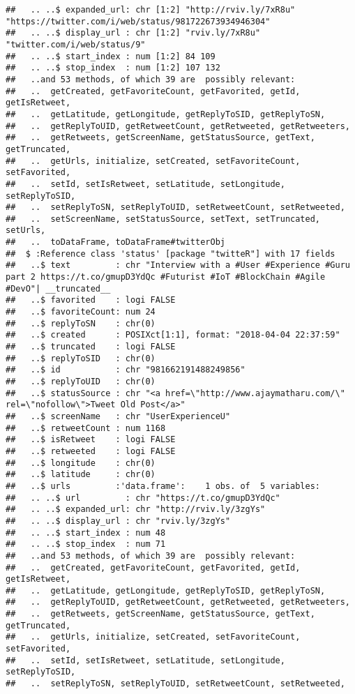 \documentclass[]{article}
\begin{document}
\begin{verbatim}
##   .. ..$ expanded_url: chr [1:2] "http://rviv.ly/7xR8u" "https://twitter.com/i/web/status/981722673934946304"
##   .. ..$ display_url : chr [1:2] "rviv.ly/7xR8u" "twitter.com/i/web/status/9"
##   .. ..$ start_index : num [1:2] 84 109
##   .. ..$ stop_index  : num [1:2] 107 132
##   ..and 53 methods, of which 39 are  possibly relevant:
##   ..  getCreated, getFavoriteCount, getFavorited, getId, getIsRetweet,
##   ..  getLatitude, getLongitude, getReplyToSID, getReplyToSN,
##   ..  getReplyToUID, getRetweetCount, getRetweeted, getRetweeters,
##   ..  getRetweets, getScreenName, getStatusSource, getText, getTruncated,
##   ..  getUrls, initialize, setCreated, setFavoriteCount, setFavorited,
##   ..  setId, setIsRetweet, setLatitude, setLongitude, setReplyToSID,
##   ..  setReplyToSN, setReplyToUID, setRetweetCount, setRetweeted,
##   ..  setScreenName, setStatusSource, setText, setTruncated, setUrls,
##   ..  toDataFrame, toDataFrame#twitterObj
##  $ :Reference class 'status' [package "twitteR"] with 17 fields
##   ..$ text         : chr "Interview with a #User #Experience #Guru part 2 https://t.co/gmupD3YdQc #Futurist #IoT #BlockChain #Agile #DevO"| __truncated__
##   ..$ favorited    : logi FALSE
##   ..$ favoriteCount: num 24
##   ..$ replyToSN    : chr(0) 
##   ..$ created      : POSIXct[1:1], format: "2018-04-04 22:37:59"
##   ..$ truncated    : logi FALSE
##   ..$ replyToSID   : chr(0) 
##   ..$ id           : chr "981662191488249856"
##   ..$ replyToUID   : chr(0) 
##   ..$ statusSource : chr "<a href=\"http://www.ajaymatharu.com/\" rel=\"nofollow\">Tweet Old Post</a>"
##   ..$ screenName   : chr "UserExperienceU"
##   ..$ retweetCount : num 1168
##   ..$ isRetweet    : logi FALSE
##   ..$ retweeted    : logi FALSE
##   ..$ longitude    : chr(0) 
##   ..$ latitude     : chr(0) 
##   ..$ urls         :'data.frame':    1 obs. of  5 variables:
##   .. ..$ url         : chr "https://t.co/gmupD3YdQc"
##   .. ..$ expanded_url: chr "http://rviv.ly/3zgYs"
##   .. ..$ display_url : chr "rviv.ly/3zgYs"
##   .. ..$ start_index : num 48
##   .. ..$ stop_index  : num 71
##   ..and 53 methods, of which 39 are  possibly relevant:
##   ..  getCreated, getFavoriteCount, getFavorited, getId, getIsRetweet,
##   ..  getLatitude, getLongitude, getReplyToSID, getReplyToSN,
##   ..  getReplyToUID, getRetweetCount, getRetweeted, getRetweeters,
##   ..  getRetweets, getScreenName, getStatusSource, getText, getTruncated,
##   ..  getUrls, initialize, setCreated, setFavoriteCount, setFavorited,
##   ..  setId, setIsRetweet, setLatitude, setLongitude, setReplyToSID,
##   ..  setReplyToSN, setReplyToUID, setRetweetCount, setRetweeted,

\end{verbatim}
\end{document}
